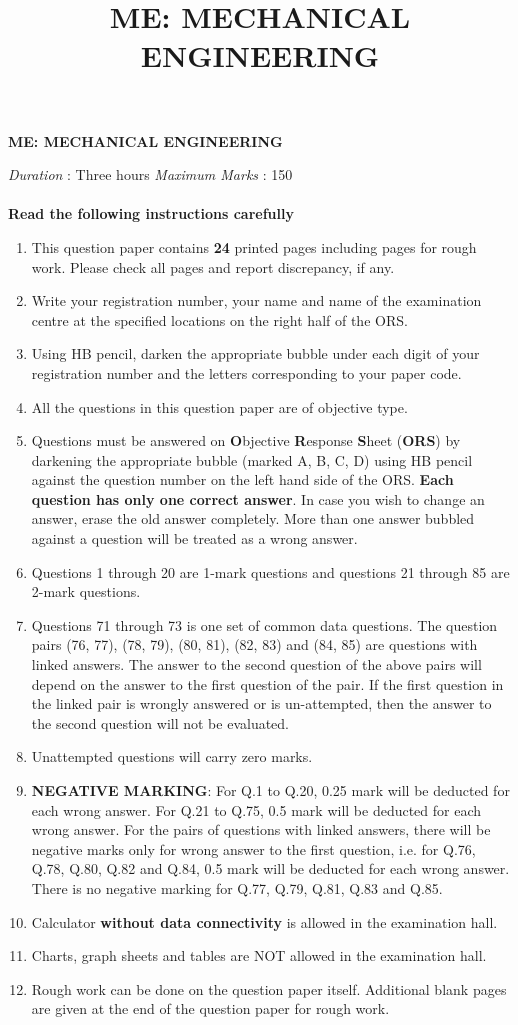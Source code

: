 \documentclass[addpoints,11pt]{exam}
\title{ME: MECHANICAL ENGINEERING}
\begin{document}
\begin{center}
    \Large
    \textbf{ME: MECHANICAL ENGINEERING}
\end{center}

\textit{Duration} : Three hours
\hfill
\textit{Maximum Marks} : 150
\\\\
\textbf{Read the following instructions carefully}
\begin{enumerate}
    \item This question paper contains \textbf{24} printed pages including pages for rough work. Please check all pages and report discrepancy, if any.
    \item Write your registration number, your name and name of the examination centre at the specified locations on the right half of the ORS.
    \item Using HB pencil, darken the appropriate bubble under each digit of your registration number and the letters corresponding to your paper code.
    \item All the questions in this question paper are of objective type.
    \item Questions must be answered on \textbf{O}bjective \textbf{R}esponse \textbf{S}heet (\textbf{ORS}) by darkening the appropriate bubble (marked A, B, C, D) using HB pencil against the question number on the left hand side of the ORS. \textbf{Each question has only one correct answer}. In case you wish to change an answer, erase the old answer completely. More than one answer bubbled against a question will be treated as a wrong answer.
    \item Questions 1 through 20 are 1-mark questions and questions 21 through 85 are 2-mark questions.
    \item Questions 71 through 73 is one set of common data questions. The question pairs (76, 77), (78, 79), (80, 81), (82, 83) and (84, 85) are questions with linked answers. The answer to the second question of the above pairs will depend on the answer to the first question of the pair. If the first question in the linked pair is wrongly answered or is un-attempted, then the answer to the second question will not be evaluated.
    \item Unattempted questions will carry zero marks.
    \item \textbf{NEGATIVE MARKING}: For Q.1 to Q.20, 0.25 mark will be deducted for each wrong answer. For Q.21 to Q.75, 0.5 mark will be deducted for each wrong answer. For the pairs of questions with linked answers, there will be negative marks only for wrong answer to the first question, i.e. for Q.76, Q.78, Q.80, Q.82 and Q.84, 0.5 mark will be deducted for each wrong answer. There is no negative marking for Q.77, Q.79, Q.81, Q.83 and Q.85.
    \item Calculator \textbf{without data connectivity} is allowed in the examination hall.
    \item Charts, graph sheets and tables are NOT allowed in the examination hall.
    \item Rough work can be done on the question paper itself. Additional blank pages are given at the end of the question paper for rough work.
\end{enumerate}
\newpage
\end{document}
